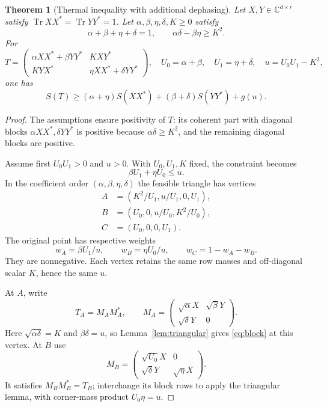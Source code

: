 \documentclass[11pt]{article}
\newtheorem{theorem}{Theorem}
\newcommand{\Tr}{\operatorname{Tr}}
\begin{document}
\begin{theorem}[Thermal inequality with additional dephasing]\label{thm:block}
Let $X,Y\in\mathbb C^{d\times r}$ satisfy $\Tr XX^*=\Tr YY^*=1$. Let
$\alpha,\beta,\eta,\delta,K\ge0$ satisfy
\[
 \alpha+\beta+\eta+\delta=1,\qquad
 \alpha\delta-\beta\eta\ge K^2.
\]
For
\[
 T=\begin{pmatrix}
 \alpha XX^*+\beta YY^*&KXY^*\\
 KYX^*&\eta XX^*+\delta YY^*
 \end{pmatrix},
 \quad U_0=\alpha+\beta,\quad U_1=\eta+\delta,\quad
 u=U_0U_1-K^2,
\]
one has
\begin{equation}\label{eq:block}
 S(T)\ge(\alpha+\eta)S(XX^*)+(\beta+\delta)S(YY^*)+g(u).
\end{equation}
\end{theorem}
\begin{proof}
The assumptions ensure positivity of $T$: its coherent part with diagonal blocks $\alpha XX^*,\delta YY^*$ is positive because $\alpha\delta\ge K^2$, and the remaining diagonal blocks are positive.

Assume first $U_0U_1>0$ and $u>0$. With $U_0,U_1,K$ fixed, the constraint becomes
\[
 \beta U_1+\eta U_0\le u.
\]
In the coefficient order $(\alpha,\beta,\eta,\delta)$ the feasible triangle has vertices
\begin{align*}
 A&=(K^2/U_1,u/U_1,0,U_1),\\
 B&=(U_0,0,u/U_0,K^2/U_0),\\
 C&=(U_0,0,0,U_1).
\end{align*}
The original point has respective weights
\[
 w_A=\beta U_1/u,\qquad w_B=\eta U_0/u,\qquad
 w_C=1-w_A-w_B.
\]
They are nonnegative. Each vertex retains the same row masses and off-diagonal scalar $K$, hence the same $u$.

At $A$, write
\[
 T_A=M_AM_A^*,\qquad
 M_A=\begin{pmatrix}\sqrt{\alpha}X&\sqrt{\beta}Y\\
                     \sqrt{\delta}Y&0\end{pmatrix}.
\]
Here $\sqrt{\alpha\delta}=K$ and $\beta\delta=u$, so Lemma~\ref{lem:triangular} gives \eqref{eq:block} at this vertex. At $B$ use
\[
 M_B=\begin{pmatrix}\sqrt{U_0}X&0\\
 \sqrt{\delta}Y&\sqrt{\eta}X\end{pmatrix}.
\]
It satisfies $M_BM_B^*=T_B$; interchange its block rows to apply the triangular lemma, with corner-mass product $U_0\eta=u$.


\end{proof}
\end{document}
